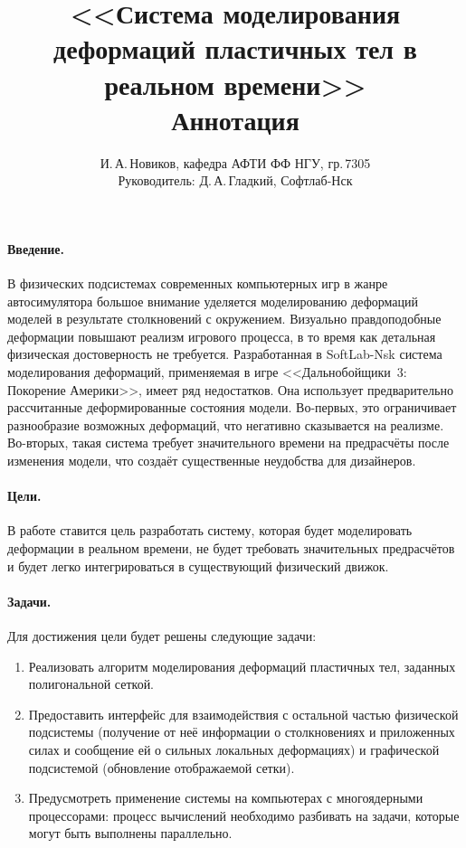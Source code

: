 \documentclass[a4paper,11pt]{article}
\author{И.\,А.\,Новиков, кафедра АФТИ ФФ НГУ, гр.\,7305\\ Руководитель: Д.\,А.\,Гладкий, Софтлаб-Нск}
\title{<<Система моделирования деформаций пластичных тел в реальном времени>>\\ Аннотация}
\begin{document}
  \maketitle
  \paragraph{Введение.}
    В физических подсистемах современных компьютерных игр в жанре автосимулятора большое внимание
    уделяется моделированию деформаций моделей в результате столкновений с окружением. Визуально
    правдоподобные деформации повышают реализм игрового процесса, в то время как детальная
    физическая достоверность не требуется. Разработанная в SoftLab-Nsk система моделирования
    деформаций, применяемая в игре <<Дальнобойщики~3: Покорение Америки>>, имеет ряд недостатков.
    Она использует предварительно рассчитанные деформированные состояния модели. Во-первых, это
    ограничивает разнообразие возможных деформаций, что негативно сказывается на реализме.
    Во-вторых, такая система требует значительного времени на предрасчёты после изменения модели,
    что создаёт существенные неудобства для дизайнеров.
  \paragraph{Цели.}
    В работе ставится цель разработать систему, которая будет моделировать деформации в реальном
    времени, не будет требовать значительных предрасчётов и будет легко интегрироваться в
    существующий физический движок.
  \pagebreak
  \paragraph{Задачи.}
    Для достижения цели будет решены следующие задачи:
    \begin{enumerate}
      \item Реализовать алгоритм моделирования деформаций пластичных тел, заданных полигональной сеткой.
      \item Предоставить интерфейс для взаимодействия с остальной частью физической подсистемы
        (получение от неё информации о столкновениях и приложенных силах и сообщение ей о
        сильных локальных деформациях) и графической подсистемой (обновление отображаемой сетки).
      \item Предусмотреть применение системы на компьютерах с многоядерными процессорами: процесс
        вычислений необходимо разбивать на задачи, которые могут быть выполнены параллельно.
    \end{enumerate}
\end{document}
